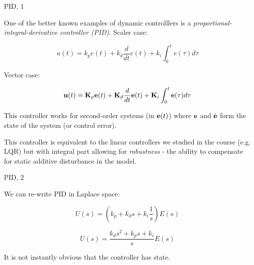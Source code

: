 \documentclass{beamer}
\begin{document}
\begin{frame}{PID, 1}
	\begin{flushleft}
		
		One of the better known examples of dynamic controlllers is a \emph{proportional-integral-derivative controller (PID)}. Scaler case:
		
		\begin{equation}
			u(t) = k_p e(t) + k_d \frac{d}{dt} e(t) + k_i \int_{0}^{t} e(\tau) d \tau
		\end{equation}
		
		Vector case:
		
		\begin{equation}
			\mathbf{u}(t) = \mathbf{K}_p \mathbf{e}(t) + \mathbf{K}_d \frac{d}{dt} \mathbf{e}(t) + \mathbf{K}_i \int_{0}^{t} \mathbf{e}(\tau) d \tau
		\end{equation}
		
		This controller works for second-order systems (in $\mathbf{e}(t)$) where $\mathbf{e}$ and $\dot{\mathbf{e}}$ form the state of the system (or control error).
		
		\bigskip
		
		This controller is equivalent to the linear controllers we studied in the course (e.g. LQR) but with integral part allowing for \emph{robustness} - the ability to compensate for static additive disturbance in the model.
		
	\end{flushleft}
\end{frame}



\begin{frame}{PID, 2}
	\begin{flushleft}
		
		We can re-write PID in Laplace space:
		
		\begin{equation}
			U(s) = \left(k_p  + k_d s + k_i \frac{1}{s} \right )E(s)
		\end{equation}
		
		\begin{equation}
			U(s) =
			\frac{k_d s^2 + k_p s + k_i }{s}E(s)
		\end{equation}
		
		It is not instantly obvious that the controller has state.
		
	\end{flushleft}
\end{frame}
\end{document}
